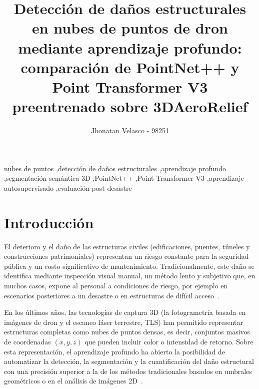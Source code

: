 \documentclass[5p]{elsarticle}
\begin{document}
\begin{frontmatter}

\title{Detección de daños estructurales en nubes de puntos de dron mediante aprendizaje profundo: comparación de PointNet++ y Point Transformer V3 preentrenado sobre 3DAeroRelief}

\author{Jhonatan Velasco - 98251}


\begin{abstract}
\end{abstract}

\begin{keyword}
nubes de puntos \sep detección de daños estructurales \sep aprendizaje profundo \sep segmentación semántica 3D \sep PointNet++ \sep Point Transformer V3 \sep aprendizaje autosupervisado \sep evaluación post-desastre
\end{keyword}

\end{frontmatter}

\section{Introducción}

El deterioro y el daño de las estructuras civiles (edificaciones, puentes, túneles y construcciones patrimoniales) representan un riesgo constante para la seguridad pública y un costo significativo de mantenimiento. Tradicionalmente, este daño se identifica mediante inspección visual manual, un método lento y subjetivo que, en muchos casos, expone al personal a condiciones de riesgo, por ejemplo en escenarios posteriores a un desastre o en estructuras de difícil acceso~\cite{Hake2023}.

En los últimos años, las tecnologías de captura 3D (la fotogrametría basada en imágenes de dron y el escaneo láser terrestre, TLS) han permitido representar estructuras completas como nubes de puntos densas, es decir, conjuntos masivos de coordenadas $(x,y,z)$ que pueden incluir color o intensidad de retorno. Sobre esta representación, el aprendizaje profundo ha abierto la posibilidad de automatizar la detección, la segmentación y la cuantificación del daño estructural con una precisión superior a la de los métodos tradicionales basados en umbrales geométricos o en el análisis de imágenes 2D~\cite{Hake2023,Zahs2023}.
\end{document}
